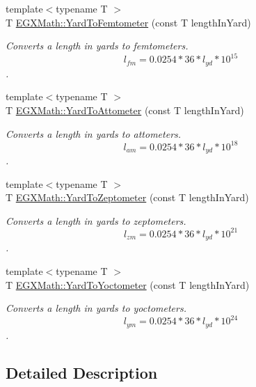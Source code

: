 \begin{DoxyCompactItemize}
{\footnotesize template$<$typename T $>$ }\\T \mbox{\hyperlink{group___e_g_x_math-_conversions-_length_conversions-_imperial-_yard-_s_i_ga682215c180b4fc28ca37e6785b59788d}{E\+G\+X\+Math\+::\+Yard\+To\+Femtometer}} (const T length\+In\+Yard)
\begin{DoxyCompactList}\small\item\em Converts a length in yards to femtometers. \[ l_{fm}=0.0254 * 36 * l_{yd} * 10^{15} \]. \end{DoxyCompactList}\item 
{\footnotesize template$<$typename T $>$ }\\T \mbox{\hyperlink{group___e_g_x_math-_conversions-_length_conversions-_imperial-_yard-_s_i_ga312090ed214669c04e4dd8a80c42ccf4}{E\+G\+X\+Math\+::\+Yard\+To\+Attometer}} (const T length\+In\+Yard)
\begin{DoxyCompactList}\small\item\em Converts a length in yards to attometers. \[ l_{am}=0.0254 * 36 * l_{yd} * 10^{18} \]. \end{DoxyCompactList}\item 
{\footnotesize template$<$typename T $>$ }\\T \mbox{\hyperlink{group___e_g_x_math-_conversions-_length_conversions-_imperial-_yard-_s_i_ga4232d885aeba5690a169c72927d57d4e}{E\+G\+X\+Math\+::\+Yard\+To\+Zeptometer}} (const T length\+In\+Yard)
\begin{DoxyCompactList}\small\item\em Converts a length in yards to zeptometers. \[ l_{zm}=0.0254 * 36 * l_{yd} * 10^{21} \]. \end{DoxyCompactList}\item 
{\footnotesize template$<$typename T $>$ }\\T \mbox{\hyperlink{group___e_g_x_math-_conversions-_length_conversions-_imperial-_yard-_s_i_gaea3e0a85c92575480e68615b7e80d26f}{E\+G\+X\+Math\+::\+Yard\+To\+Yoctometer}} (const T length\+In\+Yard)
\begin{DoxyCompactList}\small\item\em Converts a length in yards to yoctometers. \[ l_{ym}=0.0254 * 36 * l_{yd} * 10^{24} \]. \end{DoxyCompactList}\end{DoxyCompactItemize}


\subsection{Detailed Description}


